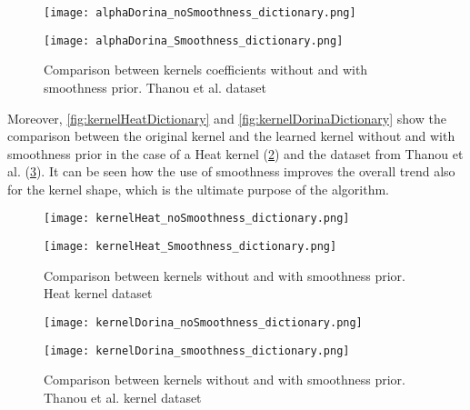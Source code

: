 \begin{figure}
  \centering
  \begin{minipage}[c]{.8\textwidth}
    \centering
    \texttt{[image: alphaDorina\_noSmoothness\_dictionary.png]}
  \end{minipage}
  \begin{minipage}[c]{.8\textwidth}
    \centering
    \texttt{[image: alphaDorina\_Smoothness\_dictionary.png]}
  \end{minipage}
  \caption{Comparison between kernels coefficients without and with smoothness prior. Thanou et al.   dataset}
  \label{fig:alphaDorinaDictionary}
\end{figure}


Moreover, \autoref{fig:kernelHeatDictionary} and \autoref{fig:kernelDorinaDictionary} show the comparison between the original kernel and the learned kernel without and with smoothness prior in the case of a Heat kernel (\ref{fig:kernelHeatDictionary}) and the dataset from  Thanou et al. (\ref{fig:kernelDorinaDictionary}). It can be seen how the use of smoothness improves the overall trend also for the kernel shape, which is the ultimate purpose of the algorithm.

\begin{figure}
  \begin{minipage}[c]{.5\textwidth}
    \centering
    \texttt{[image: kernelHeat\_noSmoothness\_dictionary.png]}
  \end{minipage}
  \begin{minipage}[c]{.5\textwidth}
    \centering
    \texttt{[image: kernelHeat\_Smoothness\_dictionary.png]}
  \end{minipage}
  \caption{Comparison between kernels without and with smoothness prior. Heat kernel dataset}
  \label{fig:kernelHeatDictionary}
\end{figure}

\begin{figure}
  \begin{minipage}[c]{.5\textwidth}
    \centering
    \texttt{[image: kernelDorina\_noSmoothness\_dictionary.png]}
  \end{minipage}
  \begin{minipage}[c]{.5\textwidth}
    \centering
    \texttt{[image: kernelDorina\_smoothness\_dictionary.png]}
  \end{minipage}
  \caption{Comparison between kernels without and with smoothness prior. Thanou et al. kernel dataset}
  \label{fig:kernelDorinaDictionary}
\end{figure}

